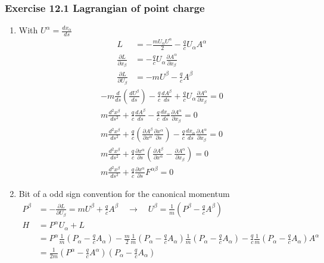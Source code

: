 \documentclass[10pt,a4paper]{article}
\theoremstyle{definition}
\begin{document}
\subsubsection{Exercise 12.1 Lagrangian of point charge}
\begin{enumerate}
\item With $U^\alpha=\frac{dx_\alpha}{ds}$
\begin{align}
	L&=-\frac{mU_\alpha U^\alpha}{2}-\frac{q}{c}U_\alpha A^\alpha\\
	\frac{\partial L}{\partial x_\beta}&=-\frac{q}{c}U_\alpha\frac{\partial A^\alpha}{\partial x_\beta}\\
	\frac{\partial L}{\partial U_\beta}&=-mU^\beta-\frac{q}{c}A^\beta
\end{align}
\begin{align}
	-m\frac{d}{ds}\left(\frac{dU^\beta}{ds}\right)-\frac{q}{c}\frac{dA^\beta}{ds}+\frac{q}{c}U_\alpha\frac{\partial A^\alpha}{\partial x_\beta}=0\\
	m\frac{d^2x^\beta}{ds^2}+\frac{q}{c}\frac{dA^\beta}{ds}-\frac{q}{c}\frac{dx_\alpha}{ds}\frac{\partial A^\alpha}{\partial x_\beta}=0\\
	m\frac{d^2x^\beta}{ds^2}+\frac{q}{c}\left(\frac{\partial A^\beta}{\partial x^\alpha}\frac{\partial x^\alpha}{\partial s}\right)-\frac{q}{c}\frac{dx_\alpha}{ds}\frac{\partial A^\alpha}{\partial x_\beta}=0\\
	m\frac{d^2x^\beta}{ds^2}+\frac{q}{c}\frac{\partial x^\alpha}{\partial s}\left(\frac{\partial A^\beta}{\partial x^\alpha}-\frac{\partial A^\alpha}{\partial x_\beta}\right)=0\\
	m\frac{d^2x^\beta}{ds^2}+\frac{q}{c}\frac{\partial x^\alpha}{\partial s}F^{\alpha\beta}=0
\end{align}
\item Bit of a odd sign convention for the canonical momentum
\begin{align}
P^\beta&=-\frac{\partial L}{\partial U_\beta}=mU^\beta+\frac{q}{c}A^\beta\quad\rightarrow\quad U^\beta=\frac{1}{m}\left(P^\beta-\frac{q}{c}A^\beta\right)\\
H&=P^\alpha U_\alpha+L\\
&=P^\alpha\frac{1}{m}\left(P_\alpha-\frac{q}{c}A_\alpha\right)-\frac{m}{2}\frac{1}{m}\left(P_\alpha-\frac{q}{c}A_\alpha\right)\frac{1}{m}\left(P_\alpha-\frac{q}{c}A_\alpha\right)-\frac{q}{c}\frac{1}{m}\left(P_\alpha-\frac{q}{c}A_\alpha\right)A^\alpha\\
&=\frac{1}{2m}\left(P^\alpha-\frac{q}{c}A^\alpha\right)\left(P_\alpha-\frac{q}{c}A_\alpha\right)

\end{align}
\end{enumerate}
\end{document}
